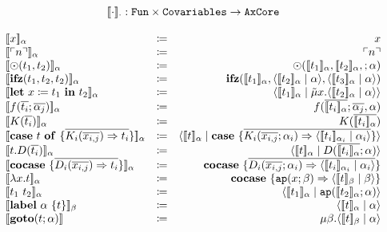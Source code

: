 \documentclass{article}
\newcommand{\translate}[1]{\ensuremath{[\![#1]\!]}}
\newcommand{\lit}[1]{\ensuremath{\ulcorner #1\urcorner}}
\newcommand{\cut}[2]{\ensuremath{\langle #1 \mid #2 \rangle}}
\newcommand{\letin}[3]{\ensuremath{\mathbf{let}\ #1 \coloneq #2\ \mathbf{in}\ #3}}
\newcommand{\caseof}[2]{\ensuremath{\mathbf{case}\ #1\ \mathbf{of}\ \{ #2 \}}}
\begin{document}
\vspace{2em}
\[
  \begin{array}{l c r}
    \multicolumn{3}{c}{\translate{\cdot}_{\cdot} : \mathtt{Fun}\times \mathtt{Covariables} \rightarrow \mathtt{AxCore}}\\
    \\
    \translate{x}_{\alpha} & \coloneq & x\\
    \translate{\lit{n}}_{\alpha} & \coloneq & \lit{n}\\
    \translate{\odot(t_1,t_2)}_{\alpha} & \coloneq & \odot(\translate{t_1}_{\alpha},\translate{t_2}_{\alpha},;\alpha)\\
    \translate{\mathbf{ifz}(t_1,t_2,t_2)}_{\alpha} & \coloneq & \mathbf{ifz}(\translate{t_1}_{\alpha},\cut{\translate{t_2}_{\alpha}}{\alpha},\cut{\translate{t_3}_{\alpha}}{\alpha})\\
    \translate{\letin{x}{t_1}{t_2}}_{\alpha} & \coloneq & \cut{\translate{t_1}_{\alpha}}{\tilde{\mu}x.\cut{\translate{t_2}_{\alpha}}{\alpha}}\\
    \translate{f(\overline{t_i};\overline{\alpha_j})}_{\alpha} & \coloneq & f(\overline{\translate{t_i}_{\alpha}};\overline{\alpha_j},\alpha)\\
    \translate{K(\overline{t_i})}_{\alpha} & \coloneq & K(\overline{\translate{t_i}_{\alpha}})\\
    \translate{\caseof{t}{\overline{K_i(\overline{x_{i,j}})\Rightarrow t_i}}}_{\alpha} & \coloneq & \cut{\translate{t}_{\alpha}}{\mathbf{case}\ \{\overline{K_i(\overline{x_{i,j}};\alpha_i)\Rightarrow \cut{\translate{t_i}_{\alpha_i}}{\alpha_i}}\}}\\
    \translate{t.D(\overline{t_i})}_{\alpha} & \coloneq & \cut{\translate{t}_{\alpha}}{D(\overline{\translate{t_i}_{\alpha}};\alpha)}\\
    \translate{\mathbf{cocase}\ \{\overline{D_i(\overline{x_{i,j}}) \Rightarrow t_i}\}}_{\alpha} & \coloneq & \mathbf{cocase}\ \{\overline{D_i(\overline{x_{i,j}};\alpha_i) \Rightarrow \cut{\translate{t_i}_{\alpha_i}}{\alpha_i}}\}\\
    \translate{\lambda x.t}_{\alpha} & \coloneq & \mathbf{cocase}\ \{ \mathtt{ap}(x;\beta) \Rightarrow \cut{\translate{t}_{\beta}}{\beta} \} \\
    \translate{t_1\ t_2}_{\alpha} & \coloneq & \cut{\translate{t_1}_{\alpha}}{\mathtt{ap}(\translate{t_2}_{\alpha};\alpha)}\\
    \translate{\mathbf{label}\ \alpha\ \{t\}}_{\beta} & \coloneq & \cut{\translate{t}_{\alpha}}{\alpha}\\
    \translate{\mathbf{goto}(t;\alpha)} & \coloneq & \mu\beta.\cut{\translate{t}_{\beta}}{\alpha}\\
  \end{array}
\]
\end{document}
